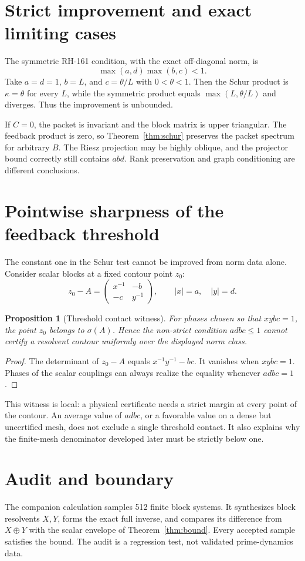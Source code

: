 \documentclass[12pt]{article}
\newtheorem{proposition}[theorem]{Proposition}
\begin{document}
\section{Strict improvement and exact limiting cases}
The symmetric RH-161 condition, with the exact off-diagonal norm, is
\[
 \max(a,d)\max(b,c)<1.
\]
Take $a=d=1$, $b=L$, and $c=\theta/L$ with $0<\theta<1$.  Then the Schur
product is $\kappa=\theta$ for every $L$, while the symmetric product equals
$\max(L,\theta/L)$ and diverges.  Thus the improvement is unbounded.

If $C=0$, the packet is invariant and the block matrix is upper triangular.
The feedback product is zero, so Theorem~\ref{thm:schur} preserves the packet
spectrum for arbitrary $B$.  The Riesz projection may be highly oblique, and
the projector bound correctly still contains $abd$.  Rank preservation and
graph conditioning are different conclusions.

\section{Pointwise sharpness of the feedback threshold}
The constant one in the Schur test cannot be improved from norm data alone.
Consider scalar blocks at a fixed contour point $z_0$:
\[
 z_0-A=
 \begin{pmatrix}x^{-1}&-b\\-c&y^{-1}\end{pmatrix},
 \qquad |x|=a,\quad |y|=d.
\]

\begin{proposition}[Threshold contact witness]
For phases chosen so that $xybc=1$, the point $z_0$ belongs to
$\sigma(A)$.  Hence the non-strict condition $adbc\le1$ cannot certify a
resolvent contour uniformly over the displayed norm class.
\end{proposition}
\begin{proof}
The determinant of $z_0-A$ equals
$x^{-1}y^{-1}-bc$.  It vanishes when $xybc=1$.  Phases of the scalar
couplings can always realize the equality whenever $adbc=1$.
\end{proof}

This witness is local: a physical certificate needs a strict margin at every
point of the contour.  An average value of $adbc$, or a favorable value on a
dense but uncertified mesh, does not exclude a single threshold contact.  It
also explains why the finite-mesh denominator developed later must be
strictly below one.

\section{Audit and boundary}
The companion calculation samples 512 finite block systems.  It synthesizes
block resolvents $X,Y$, forms the exact full inverse, and compares its
difference from $X\oplus Y$ with the scalar envelope of
Theorem~\ref{thm:bound}.  Every accepted sample satisfies the bound.  The
audit is a regression test, not validated prime-dynamics data.
\end{document}
